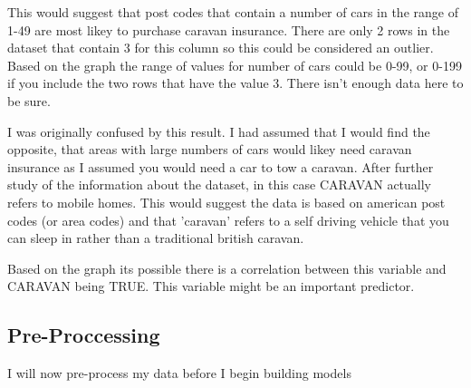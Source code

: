 \documentclass{article}\usepackage[]{graphicx}\usepackage[]{color}
\begin{document}
This would suggest that post codes that contain a number of cars in the range of 1-49 are most likey to purchase caravan insurance. There are only 2 rows in the dataset that contain 3 for this column so this could be considered an outlier. Based on the graph the range of values for number of cars could be 0-99, or 0-199 if you include the two rows that have the value 3. There isn't enough data here to be sure. 

I was originally confused by this result. I had assumed that I would find the opposite, that areas with large numbers of cars would likey need caravan insurance as I assumed you would need a car to tow a caravan. After further study of the information about the dataset, in this case CARAVAN actually refers to mobile homes. This would suggest the data is based on american post codes (or area codes) and that 'caravan' refers to a self driving vehicle that you can sleep in rather than a traditional british caravan. 

Based on the graph its possible there is a correlation between this variable and CARAVAN being TRUE. This variable might be an important predictor. 

\subsection{Pre-Proccessing}
I will now pre-process my data before I begin building models
\end{document}
